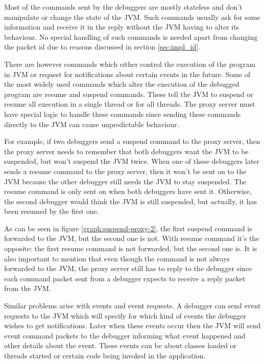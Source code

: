 \documentclass[..thesis.tex]{subfiles}
\begin{document}
Most of the commands sent by the debuggers are mostly stateless and don't manipulate or change the state of the JVM.
Such commands usually ask for some information and receive it in the reply without the JVM having to alter its behaviour.
No special handling of such commands is needed apart from changing the packet id due to reasons discussed in section \ref{sec:impl_id}.

There are however commands which either control the execution of the program in JVM or request for notifications about certain events in the future.
Some of the most widely used commands which alter the execution of the debugged program are resume and suspend commands.
These tell the JVM to suspend or resume all execution in a single thread or for all threads.
The proxy server must have special logic to handle these commands since sending these commands directly to the JVM can cause unpredictable behaviour.

For example, if two debuggers send a suspend command to the proxy server, then the proxy server needs to remember that both debuggers want the JVM to be suspended, but won't suspend the JVM twice.
When one of these debuggers later sends a resume command to the proxy server, then it won't be sent on to the JVM because the other debugger still needs the JVM to stay suspended.
The resume command is only sent on when both debuggers have sent it.
Otherwise, the second debugger would think the JVM is still suspended, but actually, it has been resumed by the first one.



As can be seen in figure \ref{graph:suspend-proxy-2}, the first suspend command is forwarded to the JVM, but the second one is not. 
With resume command it's the opposite: the first resume command is not forwarded, but the second one is.
It is also important to mention that even though the command is not always forwarded to the JVM, the proxy server still has to reply to the debugger since each command packet sent from a debugger expects to receive a reply packet from the JVM.

Similar problems arise with events and event requests.
A debugger can send event requests to the JVM which will specify for which kind of events the debugger wishes to get notifications.
Later when these events occur then the JVM will send event command packets to the debugger informing what event happened and other details about the event.
These events can be about classes loaded or threads started or certain code being invoked in the application.
\end{document}
